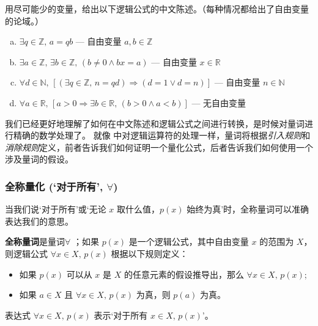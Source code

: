 \begin{exercise}
\label{exLogicalFormulaeToEnglish}
用尽可能少的变量，给出以下逻辑公式的中文陈述。（每种情况都给出了自由变量的论域。）
\begin{enumerate}[(a)]
\item $\exists q \in \mathbb{Z},\, a = qb$ --- 自由变量 $a, b \in \mathbb{Z}$
\item $\exists a \in \mathbb{Z},\, \exists b \in \mathbb{Z},\, (b \ne 0 \wedge bx = a)$ --- 自由变量 $x \in \mathbb{R}$
\item $\forall d \in \mathbb{N},\, [(\exists q \in \mathbb{Z},\, n=qd) \Rightarrow (d = 1 \vee d = n)]$ --- 自由变量 $n \in \mathbb{N}$
\item $\forall a \in \mathbb{R},\, [a > 0 \Rightarrow \exists b \in \mathbb{R},\, (b > 0 \wedge a < b)]$ --- 无自由变量
\end{enumerate}
\end{exercise}

我们已经更好地理解了如何在中文陈述和逻辑公式之间进行转换，是时候对量词进行精确的数学处理了。 就像  中对逻辑运算符的处理一样，量词将根据\textit{引入规则}和\textit{消除规则}定义，前者告诉我们如何证明一个量化公式，后者告诉我们如何使用一个涉及量词的假设。

\subsubsection*{全称量化 (`对于所有', $\forall$)}

当我们说`对于所有'或`无论 $x$ 取什么值，$p(x)$ 始终为真'时，全称量词可以准确表达我们的意思。

\begin{definition}
\label{defUniversalQuantifier}
\textbf{全称量词}是量词$\forall$ ；如果 $p(x)$ 是一个逻辑公式，其中自由变量 $x$ 的范围为 $X$，则逻辑公式 $\forall x \in X,\, p(x)$ 根据以下规则定义：
\begin{itemize}
\item \introrule{\forall} 如果 $p(x)$ 可以从 $x$ 是 $X$ 的任意元素的假设推导出，那么 $\forall x \in X,\, p(x)$;
\item \elimrule{\forall} 如果 $a \in X$ 且 $\forall x \in X,\, p(x)$ 为真，则 $p(a)$ 为真。
\end{itemize}
表达式 $\forall x \in X,\, p(x)$ 表示`对于所有 $x \in X$, $p(x)$'。
\end{definition}

